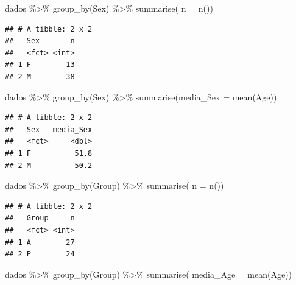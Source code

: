 \documentclass[
]{article}
\newenvironment{Shaded}{\begin{snugshade}}{\end{snugshade}}
\newcommand{\AttributeTok}[1]{\textcolor[rgb]{0.80,0.80,0.80}{#1}}
\newcommand{\FunctionTok}[1]{\textcolor[rgb]{0.94,0.94,0.56}{#1}}
\newcommand{\NormalTok}[1]{\textcolor[rgb]{0.80,0.80,0.80}{#1}}
\newcommand{\SpecialCharTok}[1]{\textcolor[rgb]{0.86,0.64,0.64}{#1}}
\begin{document}
\begin{Shaded}
\begin{Highlighting}[]
\NormalTok{dados }\SpecialCharTok{\%\textgreater{}\%} 
  \FunctionTok{group\_by}\NormalTok{(Sex) }\SpecialCharTok{\%\textgreater{}\%} 
  \FunctionTok{summarise}\NormalTok{( }\AttributeTok{n =} \FunctionTok{n}\NormalTok{())}
\end{Highlighting}
\end{Shaded}

\begin{verbatim}
## # A tibble: 2 x 2
##   Sex       n
##   <fct> <int>
## 1 F        13
## 2 M        38
\end{verbatim}

\begin{Shaded}
\begin{Highlighting}[]
\NormalTok{dados }\SpecialCharTok{\%\textgreater{}\%} 
  \FunctionTok{group\_by}\NormalTok{(Sex) }\SpecialCharTok{\%\textgreater{}\%} 
  \FunctionTok{summarise}\NormalTok{(}\AttributeTok{media\_Sex =} \FunctionTok{mean}\NormalTok{(Age))}
\end{Highlighting}
\end{Shaded}

\begin{verbatim}
## # A tibble: 2 x 2
##   Sex   media_Sex
##   <fct>     <dbl>
## 1 F          51.8
## 2 M          50.2
\end{verbatim}

\begin{Shaded}
\begin{Highlighting}[]
\NormalTok{dados }\SpecialCharTok{\%\textgreater{}\%} 
  \FunctionTok{group\_by}\NormalTok{(Group) }\SpecialCharTok{\%\textgreater{}\%} 
  \FunctionTok{summarise}\NormalTok{( }\AttributeTok{n =} \FunctionTok{n}\NormalTok{())}
\end{Highlighting}
\end{Shaded}

\begin{verbatim}
## # A tibble: 2 x 2
##   Group     n
##   <fct> <int>
## 1 A        27
## 2 P        24
\end{verbatim}

\begin{Shaded}
\begin{Highlighting}[]
\NormalTok{dados }\SpecialCharTok{\%\textgreater{}\%} 
  \FunctionTok{group\_by}\NormalTok{(Group) }\SpecialCharTok{\%\textgreater{}\%} 
  \FunctionTok{summarise}\NormalTok{( }\AttributeTok{media\_Age =} \FunctionTok{mean}\NormalTok{(Age))}
\end{Highlighting}
\end{Shaded}
\end{document}
